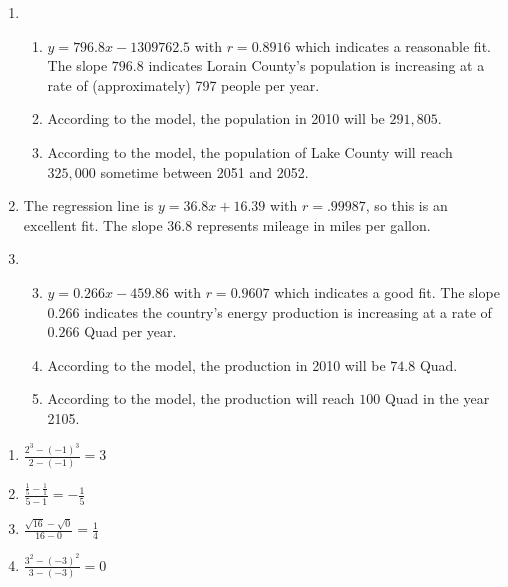 \documentclass{ximera}
\begin{document}
\begin{enumerate}
\item  \begin{enumerate}


\item  $y = 796.8x - 1309762.5$ with $r=0.8916$ which indicates a reasonable fit.  The slope $796.8$ indicates Lorain County's population is increasing at a rate of (approximately) 797 people per year.

\item  According to the model, the population in 2010 will be $291, \! 805$.

\item  According to the model, the population of Lake County will reach $325,\!000$ sometime between 2051 and 2052.

\end{enumerate}

\item The regression line is $y = 36.8x + 16.39$ with  $r = .99987$, so this is an excellent fit.  The slope $36.8$ represents mileage in miles per gallon.

\item \begin{enumerate}

\setcounter{enumii}{2}

\item $y = 0.266x - 459.86$ with $r = 0.9607$ which indicates a good fit.  The slope $0.266$ indicates the country's energy production is increasing at a rate of $0.266$ Quad per year.

\item According to the model, the production in 2010 will be $74.8$ Quad.

\item According to the model, the production will reach $100$ Quad in the year 2105.

\end{enumerate}



\setcounter{HW}{\value{enumi}}
\end{enumerate}

\vspace{-0.1in}

\begin{multicols}{4}
\begin{enumerate}
\setcounter{enumi}{\value{HW}}

\item $\frac{2^{3} - (-1)^{3}}{2 - (-1)} = 3$
\item $\frac{\frac{1}{5} - \frac{1}{1}}{5 - 1} = -\frac{1}{5}$




\item $\frac{\sqrt{16} - \sqrt{0}}{16 - 0} = \frac{1}{4}$
\item $\frac{3^{2} - (-3)^{2}}{3 - (-3)} = 0$

\setcounter{HW}{\value{enumi}}
\end{enumerate}
\end{multicols}
\end{document}

